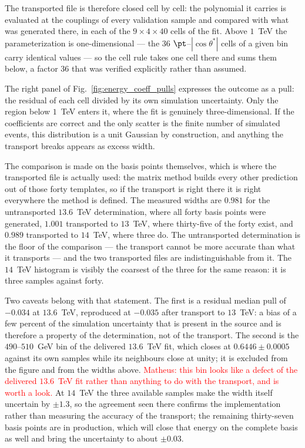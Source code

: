 The transported file is therefore closed cell by cell: the polynomial it carries is
evaluated at the couplings of every validation sample and compared with what was generated
there, in each of the $9 \times 4 \times 40$ cells of the fit. Above $1$~TeV the
parameterization is one-dimensional --- the 36 $\pt$--$|\cos\theta^*|$ cells of a given \mHH
bin carry identical values --- so the cell rule takes one cell there and sums them below,
a factor 36 that was verified explicitly rather than assumed.

The right panel of Fig.~\ref{fig:energy_coeff_pulls} expresses the outcome as a pull:
the residual of each cell divided by its own simulation uncertainty. Only the region
below $1$~TeV enters it, where the fit is genuinely three-dimensional. If the coefficients are correct and the
only scatter is the finite number of simulated events, this distribution is a unit Gaussian
by construction, and anything the transport breaks appears as excess width.

The comparison is made on the basis points themselves, which is where the transported file
is actually used: the matrix method builds every other prediction out of those forty
templates, so if the transport is right there it is right everywhere the method is
defined. The measured widths are $0.981$ for the untransported $13.6$~TeV determination,
where all forty basis points were generated, $1.001$ transported to $13$~TeV, where
thirty-five of the forty exist, and $0.989$ transported to $14$~TeV, where three do. The
untransported determination is the floor of the comparison --- the transport cannot be
more accurate than what it transports --- and the two transported files are
indistinguishable from it. The $14$~TeV histogram is visibly the coarsest of the three
for the same reason: it is three samples against forty.

Two caveats belong with that statement. The first is a residual median pull of $-0.034$ at
$13.6$~TeV, reproduced at $-0.035$ after transport to $13$~TeV: a bias of a few percent of
the simulation uncertainty that is present in the source and is therefore a property of
the determination, not of the transport. The second is the $490$--$510$~GeV bin of the
delivered $13.6$~TeV fit, which closes at $0.6446 \pm 0.0005$ against its own samples
while its neighbours close at unity; it is excluded from the figure and from the widths
above. \textcolor{red}{Matheus: this bin looks like a defect of the delivered
$13.6$~TeV fit rather than anything to do with the transport, and is worth a look.}
At $14$~TeV the three available samples make the width itself uncertain by $\pm 1.3$, so
the agreement seen there confirms the implementation rather than measuring the accuracy of
the transport; the remaining thirty-seven basis points are in production, which will close
that energy on the complete basis as well and bring the uncertainty to about $\pm 0.03$.

